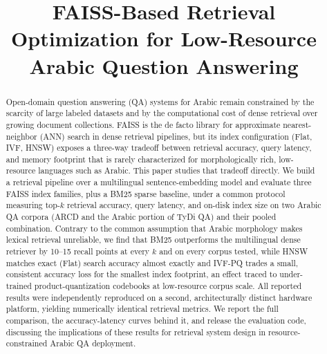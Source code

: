 \documentclass[conference]{IEEEtran}
\begin{document}
\title{FAISS-Based Retrieval Optimization for Low-Resource Arabic Question Answering}

\author{
}

\maketitle

\begin{abstract}
Open-domain question answering (QA) systems for Arabic remain constrained by the scarcity of large labeled datasets and by the computational cost of dense retrieval over growing document collections. FAISS is the de facto library for approximate nearest-neighbor (ANN) search in dense retrieval pipelines, but its index configuration (Flat, IVF, HNSW) exposes a three-way tradeoff between retrieval accuracy, query latency, and memory footprint that is rarely characterized for morphologically rich, low-resource languages such as Arabic. This paper studies that tradeoff directly. We build a retrieval pipeline over a multilingual sentence-embedding model and evaluate three FAISS index families, plus a BM25 sparse baseline, under a common protocol measuring top-$k$ retrieval accuracy, query latency, and on-disk index size on two Arabic QA corpora (ARCD and the Arabic portion of TyDi QA) and their pooled combination. Contrary to the common assumption that Arabic morphology makes lexical retrieval unreliable, we find that BM25 outperforms the multilingual dense retriever by 10--15 recall points at every $k$ and on every corpus tested, while HNSW matches exact (Flat) search accuracy almost exactly and IVF-PQ trades a small, consistent accuracy loss for the smallest index footprint, an effect traced to under-trained product-quantization codebooks at low-resource corpus scale. All reported results were independently reproduced on a second, architecturally distinct hardware platform, yielding numerically identical retrieval metrics. We report the full comparison, the accuracy-latency curves behind it, and release the evaluation code, discussing the implications of these results for retrieval system design in resource-constrained Arabic QA deployment.
\end{abstract}
\end{document}
